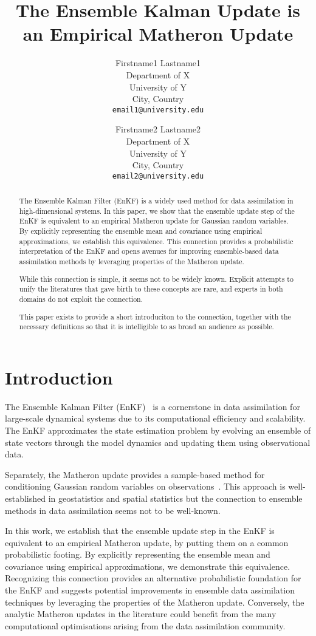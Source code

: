 \documentclass{article}
\title{The Ensemble Kalman Update is an Empirical Matheron Update}
\author{
  Firstname1 Lastname1 \\
  Department of X \\
  University of Y \\
  City, Country \\
  \texttt{email1@university.edu} \\
  \and
  Firstname2 Lastname2 \\
  Department of X \\
  University of Y \\
  City, Country \\
  \texttt{email2@university.edu} \\
}
\date{}
\begin{document}
\begin{abstract}
The Ensemble Kalman Filter (EnKF) is a widely used method for data assimilation in high-dimensional systems. In this paper, we show that the ensemble update step of the EnKF is equivalent to an empirical Matheron update for Gaussian random variables. By explicitly representing the ensemble mean and covariance using empirical approximations, we establish this equivalence. This connection provides a probabilistic interpretation of the EnKF and opens avenues for improving ensemble-based data assimilation methods by leveraging properties of the Matheron update.

While this connection is simple, it seems not to be widely known. Explicit attempts to unify the literatures that gave birth to these concepts are rare, and experts in both domains do not exploit the connection.

This paper exists to provide a short introduciton to the connection, together with the necessary definitions so that it is intelligible to as broad an audience as possible.
\end{abstract}

\section{Introduction}
The Ensemble Kalman Filter (EnKF)~\citep{Evensen2003Ensemble,Evensen2009Data} is a cornerstone in data assimilation for large-scale dynamical systems due to its computational efficiency and scalability.
The EnKF approximates the state estimation problem by evolving an ensemble of state vectors through the model dynamics and updating them using observational data.

Separately, the Matheron update provides a sample-based method for conditioning Gaussian random variables on observations~\citep{Doucet2010Note,Wilson2020Efficiently,Wilson2021Pathwise}.
This approach is well-established in geostatistics and spatial statistics but the connection to ensemble methods in data assimilation seems not to be well-known.

In this work, we establish that the ensemble update step in the EnKF is equivalent to an empirical Matheron update, by putting them on a common probabilistic footing.
By explicitly representing the ensemble mean and covariance using empirical approximations, we demonstrate this equivalence.
Recognizing this connection provides an alternative  probabilistic foundation for the EnKF and suggests potential improvements in ensemble data assimilation techniques by leveraging the properties of the Matheron update.
Conversely, the analytic Matheron updates in the literature could benefit from the many computational optimisations arising from the data assimilation community.
\end{document}
